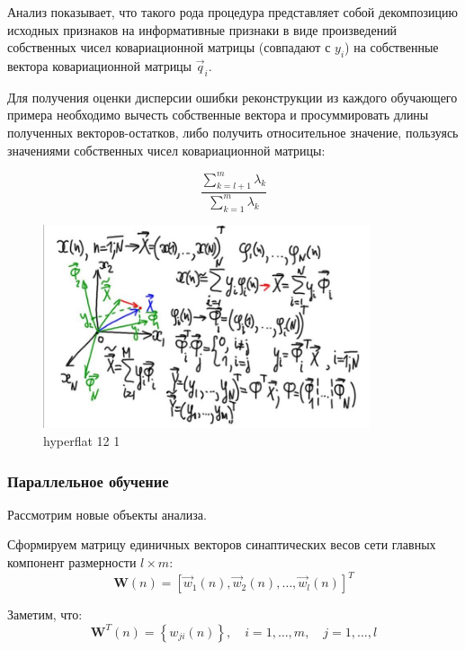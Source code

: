 \documentclass[a4paper]{article}
\numberwithin{equation}{subsection}
\begin{document}
Анализ показывает, что такого рода процедура представляет собой декомпозицию исходных
признаков на информативные признаки в виде произведений собственных чисел ковариационной матрицы
(совпадают с $y_i$) на собственные вектора ковариационной матрицы $\vec{q}_i$.

Для получения оценки дисперсии ошибки реконструкции из каждого обучающего примера необходимо 
вычесть собственные вектора и просуммировать длины полученных векторов-остатков, либо
получить относительное значение, пользуясь значениями собственных чисел ковариационной матрицы:

\begin{equation}
    \dfrac{\sum_{k=l+1}^m \lambda_k}{\sum_{k=1}^m \lambda_k}
\end{equation}

\begin{figure}[htbp]
    \centering
    \includegraphics[height=6cm]{hyperflat_12_1.jpeg}
    \caption{hyperflat 12 1}
    \label{hyperflat_12_1}
\end{figure}




\subsubsection{Параллельное обучение}

Рассмотрим новые объекты анализа.

Сформируем матрицу единичных векторов синаптических весов сети главных компонент
размерности $l \times m$:
\begin{equation}
    \mathbf{W}(n) = 
    \left[
        \vec{w}_1(n), \vec{w}_2(n) , \dots, \vec{w}_l(n)
    \right]^T
\end{equation}

Заметим, что:
\begin{equation*}
    \mathbf{W}^T(n) = 
    \left\{
        w_{ji}(n)
    \right\}, \quad i = 1, \dots, m,\quad j=1, \dots, l
\end{equation*}
\end{document}

